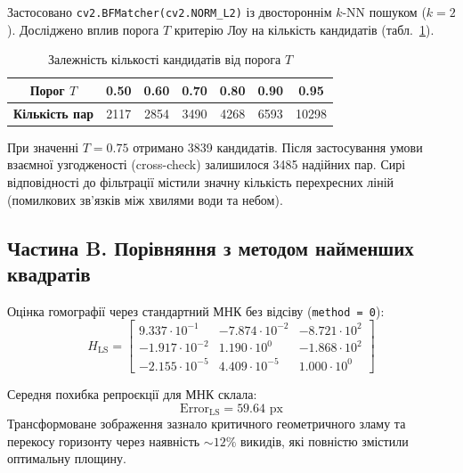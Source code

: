 \documentclass[12pt, a4paper]{article}
\begin{document}
	Застосовано \texttt{cv2.BFMatcher(cv2.NORM\_L2)} із двостороннім $k$-NN пошуком ($k=2$). Досліджено вплив порога $T$ критерію Лоу на кількість кандидатів (табл.~\ref{tab:lowe}).
	
	\begin{table}[ht]
		\centering
		\caption{Залежність кількості кандидатів від порога $T$}
		\label{tab:lowe}
		\begin{tabular}{ccccccc}
			\toprule
			\textbf{Порог $T$} & 0.50 & 0.60 & 0.70 & 0.80 & 0.90 & 0.95 \\
			\midrule
			\textbf{Кількість пар} & 2117 & 2854 & 3490 & 4268 & 6593 & 10298 \\
			\bottomrule
		\end{tabular}
	\end{table}
	
	При значенні $T=0.75$ отримано 3839 кандидатів. Після застосування умови взаємної узгодженості (cross-check) залишилося 3485 надійних пар. Сирі відповідності до фільтрації містили значну кількість перехресних ліній (помилкових зв'язків між хвилями води та небом).
	
	\begin{figure}[ht]
		\centering
	\end{figure}
	
	\subsection{Частина B. Порівняння з методом найменших квадратів}
	Оцінка гомографії через стандартний МНК без відсіву (\texttt{method = 0}):
	\begin{equation*}
		H_{\text{LS}} = \begin{bmatrix}
			9.337 \cdot 10^{-1} & -7.874 \cdot 10^{-2} & -8.721 \cdot 10^{2} \\
			-1.917 \cdot 10^{-2} & 1.190 \cdot 10^{0} & -1.868 \cdot 10^{2} \\
			-2.155 \cdot 10^{-5} & 4.409 \cdot 10^{-5} & 1.000 \cdot 10^{0}
		\end{bmatrix}
	\end{equation*}
	
	Середня похибка репроєкції для МНК склала:
	\begin{equation*}
		\text{Error}_{\text{LS}} = 59.64 \text{ px}
	\end{equation*}
	Трансформоване зображення зазнало критичного геометричного зламу та перекосу горизонту через наявність $\sim 12\%$ викидів, які повністю змістили оптимальну площину.
	
\end{document}

